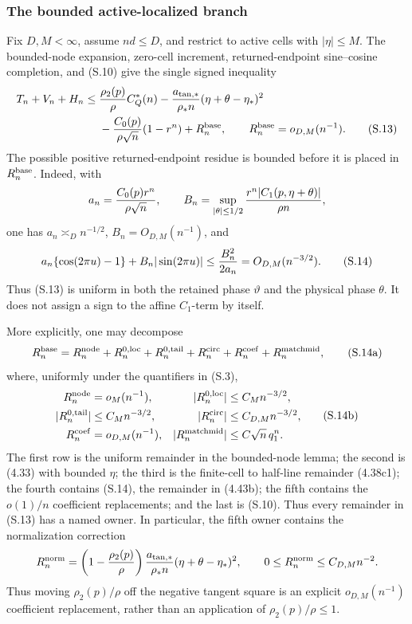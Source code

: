 \documentclass[11pt,a4paper]{article}
\numberwithin{equation}{section}
\theoremstyle{definition}
\theoremstyle{remark}
\begin{document}
\subsubsection*{The bounded active-localized branch}

Fix \(D,M<\infty\), assume \(nd\le D\), and restrict to active cells with
\(|\eta|\le M\).  The bounded-node expansion, zero-cell increment,
returned-endpoint sine--cosine completion, and (S.10) give the single
signed inequality
\begin{align}
 T_n+V_n+H_n
 \le{}&{\rho_2(p)\over\rho}C_Q^*(n)
 -{a_{\rm tan,*}\over\rho_*n}
       (\eta+\theta-\eta_*)^2\notag\\
 &-{C_0(p)\over\rho\sqrt n}(1-r^n)
 +R_n^{\rm base},
 \qquad R_n^{\rm base}=o_{D,M}(n^{-1}).              \tag{S.13}
\end{align}
The possible positive returned-endpoint residue is bounded before it is
placed in \(R_n^{\rm base}\).  Indeed, with
\[
 a_n={C_0(p)r^n\over\rho\sqrt n},\qquad
 B_n=\sup_{|\theta|\le1/2}
       {r^n|C_1(p,\eta+\theta)|\over\rho n},
\]
one has \(a_n\asymp_Dn^{-1/2}\), \(B_n=O_{D,M}(n^{-1})\), and
\[
 a_n\{\cos(2\pi u)-1\}+B_n|\sin(2\pi u)|
 \le {B_n^2\over2a_n}=O_{D,M}(n^{-3/2}).               \tag{S.14}
\]
Thus (S.13) is uniform in both the retained phase \(\vartheta\) and the
physical phase \(\theta\).  It does not assign a sign to the affine
\(C_1\)-term by itself.

More explicitly, one may decompose
\[
 R_n^{\rm base}=R_n^{\rm node}+R_n^{0,\rm loc}
                 +R_n^{0,\rm tail}+R_n^{\rm circ}+R_n^{\rm coef}
                 +R_n^{\rm matchmid},                         \tag{S.14a}
\]
where, uniformly under the quantifiers in (S.3),
\[
\begin{aligned}
 R_n^{\rm node}&=o_M(n^{-1}),&
 |R_n^{0,\rm loc}|&\le C_Mn^{-3/2},\\
 |R_n^{0,\rm tail}|&\le C_Mn^{-3/2},&
 |R_n^{\rm circ}|&\le C_{D,M}n^{-3/2},\\
 R_n^{\rm coef}&=o_{D,M}(n^{-1}),&
 |R_n^{\rm matchmid}|&\le C\sqrt n\,q_1^n.
\end{aligned}                                                \tag{S.14b}
\]
The first row is the uniform remainder in the bounded-node lemma; the
second is (4.33) with bounded \(\eta\); the third is the finite-cell to
half-line remainder (4.38c1); the fourth contains (S.14), the remainder in
(4.43b); the fifth contains the \(o(1)/n\) coefficient replacements; and the
last is (S.10).  Thus every remainder in (S.13) has a named owner.
In particular, the fifth owner contains the normalization correction
\[
 R_n^{\rm norm}
 =\left(1-{\rho_2(p)\over\rho}\right)
   {a_{\rm tan,*}\over\rho_*n}
      (\eta+\theta-\eta_*)^2,
 \qquad
 0\le R_n^{\rm norm}\le C_{D,M}n^{-2}.
\]
Thus moving $\rho_2(p)/\rho$ off the negative tangent square is an explicit
$o_{D,M}(n^{-1})$ coefficient replacement, rather than an application of
$\rho_2(p)/\rho\le1$.
\end{document}
